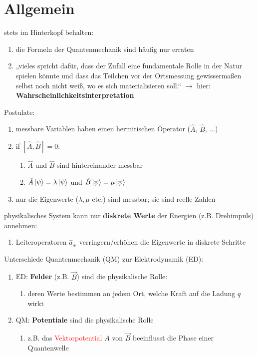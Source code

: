 \pagestyle{headings}

\section{Allgemein}

stets im Hinterkopf behalten:
\begin{enumerate}
\item die Formeln der Quantenmechanik sind häufig nur erraten
\item „vieles spricht dafür, dass der Zufall eine fundamentale Rolle in der Natur spielen könnte und dass 
das Teilchen vor der Ortsmessung gewissermaßen selbst noch nicht weiß, wo es sich materialisieren soll.“ $\rightarrow$ hier: \textbf{Wahrscheinlichkeitsinterpretation}
\end{enumerate}

Postulate:
\begin{enumerate}
\item messbare Variablen haben einen hermitischen Operator ($\hat{A}$, $\hat{B}$, ...) 
\item if $[\hat{A},\hat{B}]=0$:
\begin{enumerate}
    \item $\hat{A}$ und $\hat{B}$ sind hintereinander messbar
    \item $\hat{A}\ket{\psi}=\lambda\ket{\psi}$ und $\hat{B}\ket{\psi}=\mu\ket{\psi}$
\end{enumerate}
\item nur die Eigenwerte ($\lambda,\mu$ etc.) sind messbar; sie sind reelle Zahlen 

\end{enumerate}

physikalisches System kann nur \textbf{diskrete Werte} der Energien (z.B. Drehimpuls) annehmen:
\begin{enumerate}
    \item Leiteroperatoren $\hat{a}_\pm$ verringern/erhöhen die Eigenwerte in diskrete Schritte 
\end{enumerate}

Unterschiede Quantenmechanik (QM) zur Elektrodynamik (ED):
\begin{enumerate}
    \item ED: \textbf{Felder} (z.B. $\vec{B}$) sind die physikalische Rolle:
    \begin{enumerate}
        \item deren Werte bestimmen an jedem Ort, welche Kraft auf die Ladung $q$ wirkt

    \end{enumerate}
    \item QM: \textbf{Potentiale} sind die physikalische Rolle
\begin{enumerate}
    \item z.B. das \textcolor{red}{Vektorpotential} $A$ von $\vec{B}$ beeinflusst die Phase einer Quantenwelle 
\end{enumerate}
\end{enumerate}
